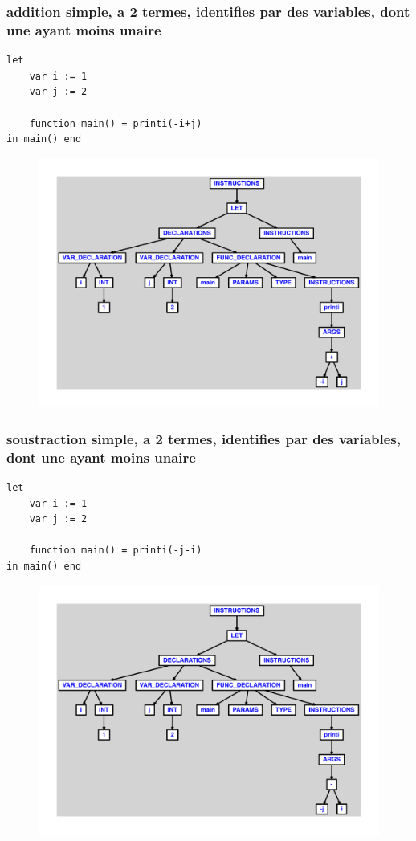 \documentclass{article}
\begin{document}
\subsubsection{addition simple, a 2 termes, identifies par des variables, dont une ayant moins unaire}
\begin{lstlisting}
let
	var i := 1
	var j := 2

	function main() = printi(-i+j)
in main() end
\end{lstlisting}
\newpage
\begin{figure}[H]
\centering
\includegraphics[max width=\textwidth]{ast/ast_75.pdf}
\end{figure}
\newpage
\subsubsection{soustraction simple, a 2 termes, identifies par des variables, dont une ayant moins unaire}
\begin{lstlisting}
let
	var i := 1
	var j := 2

	function main() = printi(-j-i)
in main() end
\end{lstlisting}
\newpage
\begin{figure}[H]
\centering
\includegraphics[max width=\textwidth]{ast/ast_76.pdf}
\end{figure}
\newpage
\end{document}
